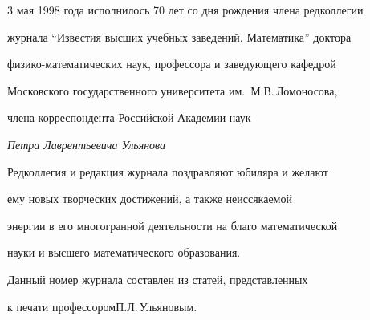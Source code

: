 




\pagestyle{empty}








\phantom{.}


\vskip 4cm


\par


\bigskip


\bigskip


\bigskip


\par





3 мая 1998 года исполнилось 70 лет со дня рождения члена редколлегии


журнала ``Известия высших учебных заведений. Математика'' доктора


физико-математических наук, профессора и заведующего кафедрой


Московского государственного университета им.~М.В.\,Ломоносова,


члена-корреспондента Российской Академии наук


\smallskip





\centerline{\it Петра Лаврентьевича Ульянова}


\smallskip





Редколлегия и редакция журнала поздравляют юбиляра и желают


ему новых творческих достижений, а также неиссякаемой


энергии в его многогранной деятельности на благо математической


науки и высшего математического образования.


\bigskip





Данный номер журнала составлен из статей, представленных


к печати профессором\linebreak П.Л.\,Ульяновым.














